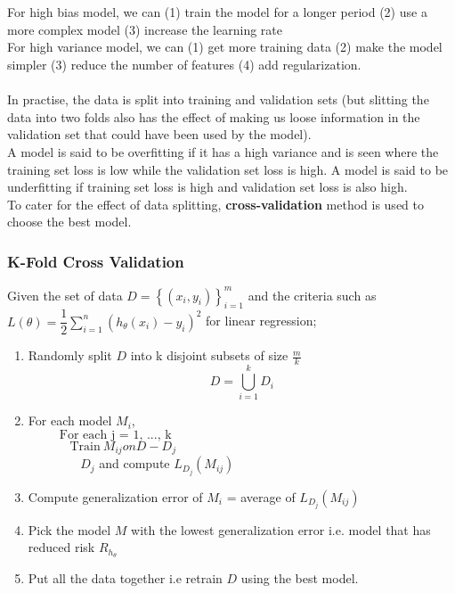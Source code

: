 \documentclass[12pt,a4paper,titlepage,landscape]{book}
\begin{document}
	\\\\
	For high bias model, we can (1) train the model for a longer period (2) use a more complex model (3) increase the learning rate\\
	For high variance model, we can (1) get more training data (2) make the model simpler (3) reduce the number of features (4) add regularization. \\\\
	In practise, the data is split into training and validation sets (but slitting the data into two folds also has the effect of making us loose information in the validation set that could have been used by the model). \\
	A model is said to be overfitting  if it has a high variance and is seen where the training set loss is low while the validation set loss is high. A model is said to be underfitting if training set loss is high and validation set loss is also high.\\
	To cater for the effect of data splitting, \textbf{cross-validation} method is used to choose the best model.
	
	\subsubsection{K-Fold Cross Validation}
	Given the set of data $D = \left\{(x_i, y_i)\right\}_{i=1}^m$ and the criteria such as $L(\theta) = \dfrac{1}{2}\sum_{i=1}^{n}\left(h_\theta(x_i) - y_i\right)^2$ for linear regression;
	\begin{enumerate}
		\item Randomly split $D$ into k disjoint subsets of size $\frac{m}{k}$
		$$D = \bigcup\limits_{i=1}^{k}D_i$$
		\item For each model $M_i$, \\
		${}\hspace{30pt} \text{For each j = 1, ..., k}$ \\
		${}\hspace{40pt}  \text{Train}~ M_{ij} on D - D_j$ \\
		${}\hspace{40pt}$  ~$D_j$ and compute $L_{D_j}(M_{ij})$
		\item Compute generalization error of $M_i$ = average of $L_{D_j}(M_{ij})$
		\item Pick the model $M$ with the lowest generalization error i.e. model that has reduced risk $R_{h_\theta}$
		\item Put all the data together i.e retrain $D$ using the best model.
	\end{enumerate}
\end{document}
